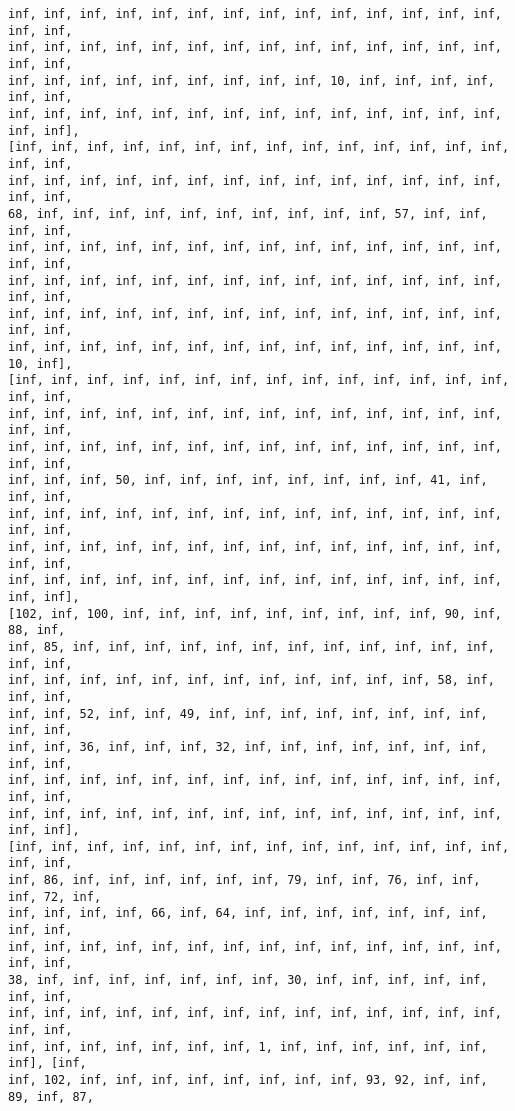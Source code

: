 \documentclass[11pt]{article}
\begin{document}
\begin{Verbatim}[commandchars=\\\{\}]
inf, inf, inf, inf, inf, inf, inf, inf, inf, inf, inf, inf, inf, inf, inf, inf,
inf, inf, inf, inf, inf, inf, inf, inf, inf, inf, inf, inf, inf, inf, inf, inf,
inf, inf, inf, inf, inf, inf, inf, inf, inf, 10, inf, inf, inf, inf, inf, inf,
inf, inf, inf, inf, inf, inf, inf, inf, inf, inf, inf, inf, inf, inf, inf, inf],
[inf, inf, inf, inf, inf, inf, inf, inf, inf, inf, inf, inf, inf, inf, inf, inf,
inf, inf, inf, inf, inf, inf, inf, inf, inf, inf, inf, inf, inf, inf, inf, inf,
68, inf, inf, inf, inf, inf, inf, inf, inf, inf, inf, 57, inf, inf, inf, inf,
inf, inf, inf, inf, inf, inf, inf, inf, inf, inf, inf, inf, inf, inf, inf, inf,
inf, inf, inf, inf, inf, inf, inf, inf, inf, inf, inf, inf, inf, inf, inf, inf,
inf, inf, inf, inf, inf, inf, inf, inf, inf, inf, inf, inf, inf, inf, inf, inf,
inf, inf, inf, inf, inf, inf, inf, inf, inf, inf, inf, inf, inf, inf, 10, inf],
[inf, inf, inf, inf, inf, inf, inf, inf, inf, inf, inf, inf, inf, inf, inf, inf,
inf, inf, inf, inf, inf, inf, inf, inf, inf, inf, inf, inf, inf, inf, inf, inf,
inf, inf, inf, inf, inf, inf, inf, inf, inf, inf, inf, inf, inf, inf, inf, inf,
inf, inf, inf, 50, inf, inf, inf, inf, inf, inf, inf, inf, 41, inf, inf, inf,
inf, inf, inf, inf, inf, inf, inf, inf, inf, inf, inf, inf, inf, inf, inf, inf,
inf, inf, inf, inf, inf, inf, inf, inf, inf, inf, inf, inf, inf, inf, inf, inf,
inf, inf, inf, inf, inf, inf, inf, inf, inf, inf, inf, inf, inf, inf, inf, inf],
[102, inf, 100, inf, inf, inf, inf, inf, inf, inf, inf, inf, 90, inf, 88, inf,
inf, 85, inf, inf, inf, inf, inf, inf, inf, inf, inf, inf, inf, inf, inf, inf,
inf, inf, inf, inf, inf, inf, inf, inf, inf, inf, inf, inf, 58, inf, inf, inf,
inf, inf, 52, inf, inf, 49, inf, inf, inf, inf, inf, inf, inf, inf, inf, inf,
inf, inf, 36, inf, inf, inf, 32, inf, inf, inf, inf, inf, inf, inf, inf, inf,
inf, inf, inf, inf, inf, inf, inf, inf, inf, inf, inf, inf, inf, inf, inf, inf,
inf, inf, inf, inf, inf, inf, inf, inf, inf, inf, inf, inf, inf, inf, inf, inf],
[inf, inf, inf, inf, inf, inf, inf, inf, inf, inf, inf, inf, inf, inf, inf, inf,
inf, 86, inf, inf, inf, inf, inf, inf, 79, inf, inf, 76, inf, inf, inf, 72, inf,
inf, inf, inf, inf, 66, inf, 64, inf, inf, inf, inf, inf, inf, inf, inf, inf,
inf, inf, inf, inf, inf, inf, inf, inf, inf, inf, inf, inf, inf, inf, inf, inf,
38, inf, inf, inf, inf, inf, inf, inf, 30, inf, inf, inf, inf, inf, inf, inf,
inf, inf, inf, inf, inf, inf, inf, inf, inf, inf, inf, inf, inf, inf, inf, inf,
inf, inf, inf, inf, inf, inf, inf, 1, inf, inf, inf, inf, inf, inf, inf], [inf,
inf, 102, inf, inf, inf, inf, inf, inf, inf, inf, 93, 92, inf, inf, 89, inf, 87,

\end{Verbatim}
\end{document}
